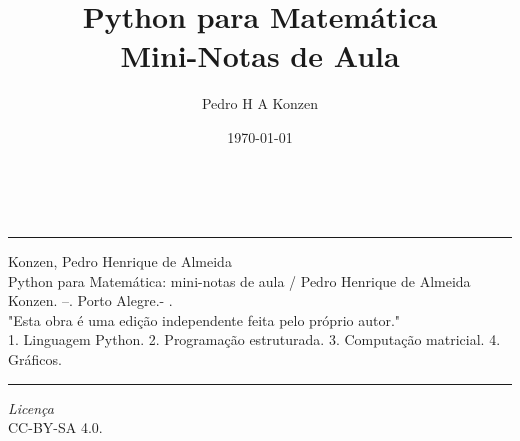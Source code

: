 \documentclass[a4paper,10pt,twoside]{article}
\begin{document}
\title{Python para Matemática\\{\small Mini-Notas de Aula}}
\author{Pedro H A Konzen}
\date{\today}

\maketitle

\ifisbook
~
\vspace{3.5in}
\hrule
Konzen, Pedro Henrique de Almeida\\
\indent\hspace{2em}Python para Matemática: mini-notas de aula / Pedro Henrique de Almeida Konzen. --{\the\year}. Porto Alegre.- {\the\year}.\\
\indent\hspace{2em}"Esta obra é uma edição independente feita pelo próprio autor."\\
\indent\hspace{2em}1. Linguagem Python. 2. Programação estruturada. 3. Computação matricial. 4. Gráficos.\\
\hrule
\vspace{1cm}
\begin{center}
  \textit{Licença}\\CC-BY-SA 4.0.
\end{center}
\fi

\newpage
\tableofcontents











{}
\theendnotes

\newpage


  
\newpage

\printindex
\end{document}

